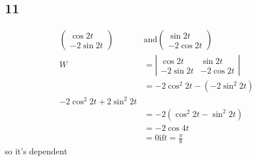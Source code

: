 \documentclass{article}
\begin{document}
\subsection*{11}
\begin{align*}
  \left(\begin{array}{c}\cos 2t\\-2\sin 2t\end{array}\right) &\text{and} \left(\begin{array}{c}\sin 2t\\-2\cos 2t\end{array}\right)\\
  W&=\left\lvert\begin{array}{cc}\cos 2t&\sin 2t\\-2\sin 2t&-2\cos 2t\end{array}\right\rvert\\
  &=-2\cos^2 2t-(-2\sin^2 2t)\\
  -2\cos^2 2t+2\sin^2 2t\\
  &=-2(\cos^2 2t-\sin^2 2t)\\
  &=-2\cos 4t\\
  &=0 \text{if} t=\frac{\pi}{8}
\end{align*}
so it's dependent
\end{document}
